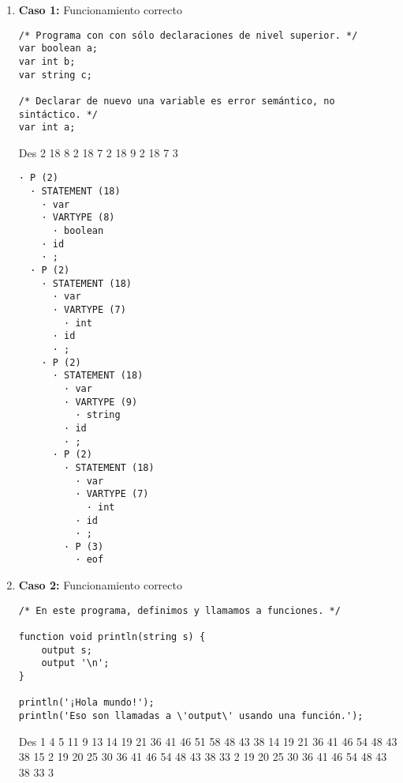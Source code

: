 \begin{enumerate}

    \item \textbf{Caso 1:} Funcionamiento correcto
    \begin{tcolorbox}[title={Código fuente}, colback=white]
        \begin{lstlisting}
/* Programa con con sólo declaraciones de nivel superior. */
var boolean a;
var int b;
var string c;

/* Declarar de nuevo una variable es error semántico, no sintáctico. */
var int a;
        \end{lstlisting}
    \end{tcolorbox}

    \begin{tcolorbox}[title={Volcado del fichero de parse}, colback=white]
Des 2 18 8 2 18 7 2 18 9 2 18 7 3
    \end{tcolorbox}

    \begin{tcolorbox}[title={Árbol sintáctico generado con la herramienta VASt}, colback=white]
        \begin{lstlisting}
· P (2)
  · STATEMENT (18)
    · var
    · VARTYPE (8)
      · boolean
    · id
    · ;
  · P (2)
    · STATEMENT (18)
      · var
      · VARTYPE (7)
        · int
      · id
      · ;
    · P (2)
      · STATEMENT (18)
        · var
        · VARTYPE (9)
          · string
        · id
        · ;
      · P (2)
        · STATEMENT (18)
          · var
          · VARTYPE (7)
            · int
          · id
          · ;
        · P (3)
          · eof
        \end{lstlisting}
    \end{tcolorbox}


    \item \textbf{Caso 2:} Funcionamiento correcto
    \begin{tcolorbox}[title={Código fuente}, colback=white]
        \begin{lstlisting}
/* En este programa, definimos y llamamos a funciones. */

function void println(string s) {
    output s;
    output '\n';
}

println('¡Hola mundo!');
println('Eso son llamadas a \'output\' usando una función.');
        \end{lstlisting}
    \end{tcolorbox}

        \begin{tcolorbox}[title={Volcado del fichero de parse}, colback=white, enhanced jigsaw]
Des 1 4 5 11 9 13 14 19 21 36 41 46 51 58 48 43 38 14 19 21 36 41 46 54 48 43 38 15 2 19 20 25 30 36 41 46 54 48 43 38 33 2 19 20 25 30 36 41 46 54 48 43 38 33 3
    \end{tcolorbox}


\end{enumerate}
